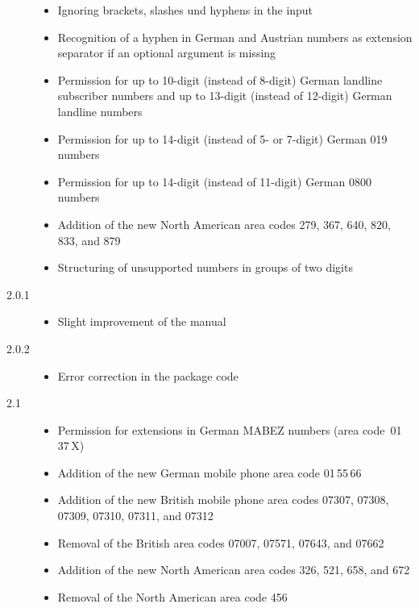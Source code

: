 \documentclass[numbers=noenddot]{scrreprt}
\begin{document}
\begin{description}
\begin{itemize}
\item Ignoring brackets, slashes und hyphens in the input
\item Recognition of a hyphen in German and Austrian numbers as extension separator if an optional argument is missing
\item Permission for up to 10-digit (instead of 8-digit) German landline subscriber numbers and up to 13-digit (instead of 12-digit) German landline numbers
\item Permission for up to 14-digit (instead of 5- or 7-digit) German 019 numbers
\item Permission for up to 14-digit (instead of 11-digit) German 0800 numbers
\item Addition of the new North American area codes 279, 367, 640, 820, 833, and 879
\item Structuring of unsupported numbers in groups of two digits
\end{itemize}
\item[2.0.1] 
\begin{itemize}
\item Slight improvement of the manual
\end{itemize}
\item[2.0.2] 
\begin{itemize}
\item Error correction in the package code
\end{itemize}
\item[2.1] 
\begin{itemize}
\item Permission for extensions in German MABEZ numbers (area code~01\,37\,X)
\item Addition of the new German mobile phone area code 01\,55\,66
\item Addition of the new British mobile phone area codes 07307, 07308, 07309, 07310, 07311, and 07312
\item Removal of the British area codes 07007, 07571, 07643, and 07662
\item Addition of the new North American area codes 326, 521, 658, and 672
\item Removal of the North American area code 456
\end{itemize}
\end{description}
\end{document}
